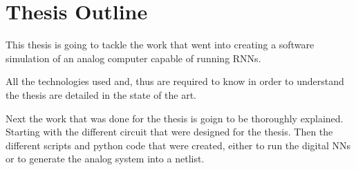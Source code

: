 \section{Thesis Outline}
\label{sec:outline}

This thesis is going to tackle the work that went into creating a software simulation of an analog computer capable of running \aclp{RNN}.

All the technologies used and, thus are required to know in order to understand the thesis are detailed in the state of the art.

Next the work that was done for the thesis is goign to be thoroughly explained. Starting with the different circuit that were designed for the thesis. Then the different scripts and python code that were created, either to run the digital \acp{NN} or to generate the analog system into a netlist.

